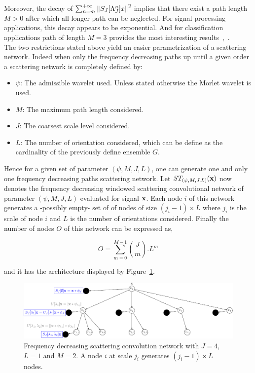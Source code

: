 \documentclass[a4paper,11pt]{report}
\begin{document}
			Moreover, the decay of $\sum_{n=m}^{+\infty} \left\lVert S_{J}[\Lambda_{J}^{n}]x \right\rVert^{2}$ implies that there exist a path length $M > 0$ after which all longer path can be neglected. For signal processing applications, this decay appears to be exponential. And for classification applications path of length $M = 3$ provides the most interesting results~\citep{anden2011multiscale},~\citep{bruna2010classification}.\\
			
			The two restrictions stated above yield an easier parametrization of a scattering network. Indeed when only the frequency decreasing paths up until a given order a scattering network is completely defined by:\\
			\begin{itemize}
				\item $\psi$: The admissible wavelet used. Unless stated otherwise the Morlet wavelet is used.
			  \item $M$: The maximum path length considered.
			  \item $J$: The coarsest scale level considered.
			  \item $L$: The number of orientation considered, which can be define as the cardinality of the previously define ensemble $G$.\\
			\end{itemize}
			
			Hence for a given set of parameter $(\psi, M,J,L)$, one can generate one and only one frequency decreasing paths scattering network. Let $ST_{(\psi, M,J,L)}({\bf x})$ now denotes the frequency decreasing windowed scattering convolutional network of parameter $(\psi, M,J,L)$ evaluated for signal ${\bf x}$. Each node $i$ of this network generates a -possibly empty- set of of nodes of size $(j_{i}-1) \times L$ where $j_{i}$ is the scale of node $i$ and $L$ is the number of orientations considered. Finally the number of nodes $O$ of this network can be expressed as,
			
			\begin{equation}
			  O = \sum_{m=0}^{M-1} \binom{J}{m} . L^{m}
			  \label{eq:ST number of node}
			\end{equation}

			and it has the architecture displayed by Figure~\ref{fig:SCN 2}. 
			
			\begin{figure}[h]
				\begin{center}
					\includegraphics[width=5in]{ST_freqDec_crop.pdf}
					\caption[Frequency decreasing scattering convolution network.]{\centering  Frequency decreasing scattering convolution network with $J=4$, $L=1$ and $M=2$. A node $i$ at scale $j_{i}$ generates $(j_{i}-1) \times L$ nodes. }
					\label{fig:SCN 2}
				\end{center}	
      \end{figure}
      
\end{document}
